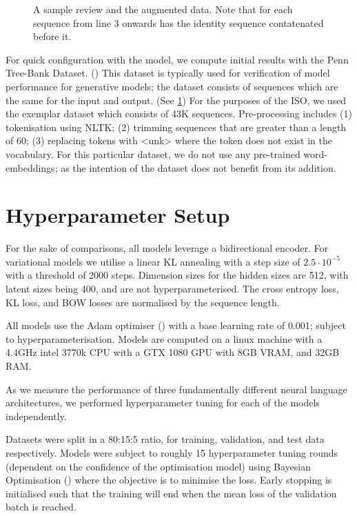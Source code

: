 \documentclass[12pt,twoside]{report}
\begin{document}
\begin{figure}[!ht]
	\centering
	
	\caption{A sample review and the augmented data. Note that for each sequence from line 3 onwards has the identity sequence contatenated before it. \label{ptb_example}}
	\end{figure}

For quick configuration with the model, we compute initial results with the Penn Tree-Bank Dataset. (\cite{marcus_building_2002}) This dataset is typically used for verification of model performance for generative models; the dataset consists of sequences which are the same for the input and output. (See \ref{ptb_example}) For the purposes of the ISO, we used the exemplar dataset which consists of 43K sequences. Pre-processing includes (1) tokenisation using NLTK; (2) trimming sequences that are greater than a length of 60; (3) replacing tokens with <unk> where the token does not exist in the vocabulary. For this particular dataset, we do not use any pre-trained word-embeddings; as the intention of the dataset does not benefit from its addition. 


\section{Hyperparameter Setup}

For the sake of comparisons, all models leverage a bidirectional encoder. For variational models we utilise a linear KL annealing with a step size of $2.5\cdot 10^{-5}$ with a threshold of 2000 steps. Dimension sizes for the hidden sizes are 512, with latent sizes being 400, and are not hyperparameterised. The cross entropy loss, KL loss, and BOW losses are normalised by the sequence length. 

All models use the Adam optimiser (\cite{kingma_adam:_2014}) with a base learning rate of 0.001; subject to hyperparameterisation. Models are computed on a linux machine with a  4.4GHz intel 3770k CPU with a GTX 1080 GPU with 8GB VRAM, and 32GB RAM.

As we measure the performance of three fundamentally different neural language architectures, we performed hyperparameter tuning for each of the models independently.

Datasets were split in a 80:15:5 ratio, for training, validation, and test data respectively. Models were subject to roughly 15 hyperparameter tuning rounds (dependent on the confidence of the optimisation model) using Bayesian Optimisation (\cite{gpyopt_authors_gpyopt:_2016}) where the objective is to minimise the loss. Early stopping is initialised such that the training will end when the mean loss of the validation batch is reached. 
\end{document}
